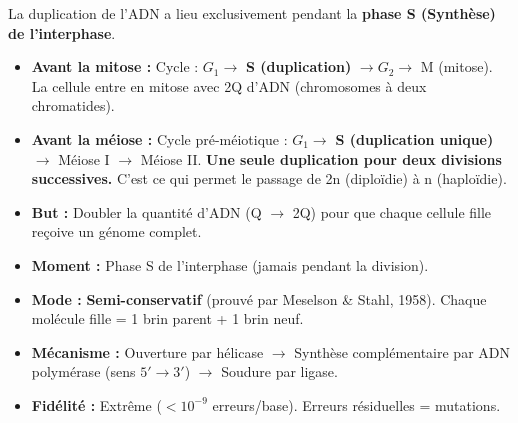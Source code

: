 \documentclass[11pt]{article}
\begin{document}
\begin{propriete}
La duplication de l'ADN a lieu exclusivement pendant la \textbf{phase S (Synthèse) de l'interphase}.
\begin{itemize}
    \item \textbf{Avant la mitose :} Cycle : $G_1 \to$ \textbf{S (duplication)} $\to G_2 \to$ M (mitose). La cellule entre en mitose avec 2Q d'ADN (chromosomes à deux chromatides).
    \item \textbf{Avant la méiose :} Cycle pré-méiotique : $G_1 \to$ \textbf{S (duplication unique)} $\to$ Méiose I $\to$ Méiose II. \textbf{Une seule duplication pour deux divisions successives.} C'est ce qui permet le passage de 2n (diploïdie) à n (haploïdie).
\end{itemize}
\end{propriete}

\begin{aretenir}
\begin{itemize}
    \item \textbf{But :} Doubler la quantité d'ADN (Q $\to$ 2Q) pour que chaque cellule fille reçoive un génome complet.
    \item \textbf{Moment :} Phase S de l'interphase (jamais pendant la division).
    \item \textbf{Mode :} \textbf{Semi-conservatif} (prouvé par Meselson \& Stahl, 1958). Chaque molécule fille = 1 brin parent + 1 brin neuf.
    \item \textbf{Mécanisme :} Ouverture par hélicase $\to$ Synthèse complémentaire par ADN polymérase (sens $5'\to3'$) $\to$ Soudure par ligase.
    \item \textbf{Fidélité :} Extrême ($< 10^{-9}$ erreurs/base). Erreurs résiduelles = mutations.
\end{itemize}
\end{aretenir}
\end{document}
